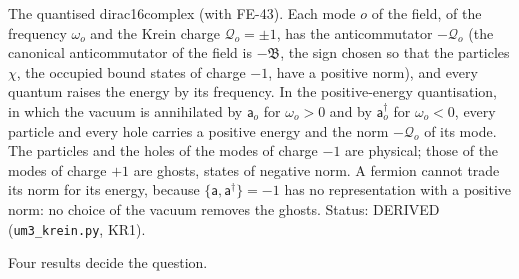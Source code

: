 \documentclass[
  10pt,
]{article}
\begin{document}
The quantised dirac16complex (with FE-43). Each mode \(o\) of the field,
of the frequency \(\omega_o\) and the Krein charge
\(\mathcal{Q}_o = \pm1\), has the anticommutator \(-\mathcal{Q}_o\) (the
canonical anticommutator of the field is \(-\mathfrak{B}\), the sign
chosen so that the particles \(\chi\), the occupied bound states of
charge \(-1\), have a positive norm), and every quantum raises the
energy by its frequency. In the positive-energy quantisation, in which
the vacuum is annihilated by \(\mathsf{a}_o\) for \(\omega_o > 0\) and
by \(\mathsf{a}_o^\dagger\) for \(\omega_o < 0\), every particle and
every hole carries a positive energy and the norm \(-\mathcal{Q}_o\) of
its mode. The particles and the holes of the modes of charge \(-1\) are
physical; those of the modes of charge \(+1\) are ghosts, states of
negative norm. A fermion cannot trade its norm for its energy, because
\(\{\mathsf{a}, \mathsf{a}^\dagger\} = -1\) has no representation with a
positive norm: no choice of the vacuum removes the ghosts. Status:
DERIVED (\texttt{um3\_krein.py}, KR1).

Four results decide the question.
\end{document}
